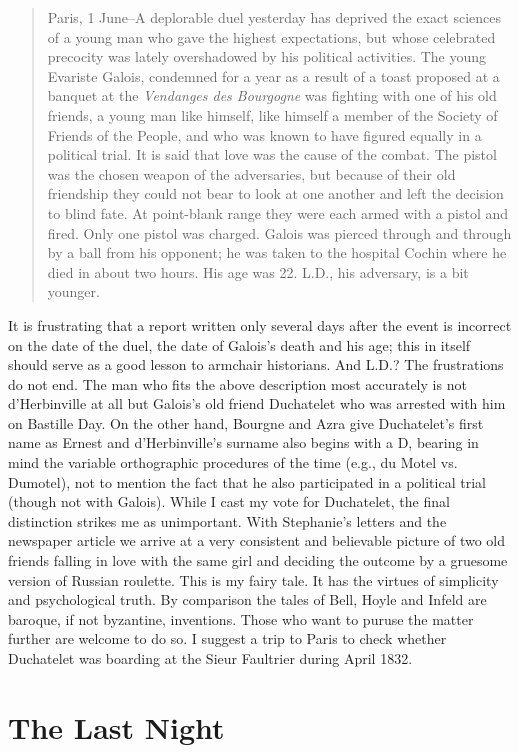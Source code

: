 \documentclass[12pt]{article}
\begin{document}
\begin{quote}
Paris, 1 June--A deplorable duel yesterday has deprived the exact sciences of a young man who gave the highest expectations, but whose celebrated precocity was lately overshadowed by his political activities. The young Evariste Galois, condemned for a year as a result of a toast proposed at a banquet at the {\it Vendanges des Bourgogne} was fighting with one of his old friends, a young man like himself, like himself a member of the Society of Friends of the People, and who was known to have figured equally in a political trial. It is said that love was the cause of the combat. The pistol was the chosen weapon of the adversaries, but because of their old friendship they could not bear to look at one another and left the decision to blind fate. At point-blank range they were each armed with a pistol and fired. Only one pistol was charged. Galois was pierced through and through by a ball from his opponent; he was taken to the hospital Cochin where he died in about two hours. His age was 22. L.D., his adversary, is a bit younger.
\end{quote}
It is frustrating that a report written only several days after the event is incorrect on the date of the duel, the date of Galois's death and his age; this in itself should serve as a good lesson to armchair historians. And L.D.? The frustrations do not end. The man who fits the above description most accurately is not d'Herbinville at all but Galois's old friend Duchatelet who was arrested with him on Bastille Day. On the other hand, Bourgne and Azra give Duchatelet's first name as Ernest and d'Herbinville's surname also begins with a D, bearing in mind the variable orthographic procedures of the time (e.g., du Motel vs. Dumotel), not to mention the fact that he also participated in a political trial (though not with Galois). While I cast my vote for Duchatelet, the final distinction strikes me as unimportant. With Stephanie's letters and the newspaper article we arrive at a very consistent and believable picture of two old friends falling in love with the same girl and deciding the outcome by a gruesome version of Russian roulette. This is my fairy tale. It has the virtues of simplicity and psychological truth. By comparison the tales of Bell, Hoyle and Infeld are baroque, if not byzantine, inventions. Those who want to puruse the matter further are welcome to do so. I suggest a trip to Paris to check whether Duchatelet was boarding at the Sieur Faultrier during April 1832.

\section{The Last Night}
\end{document}
